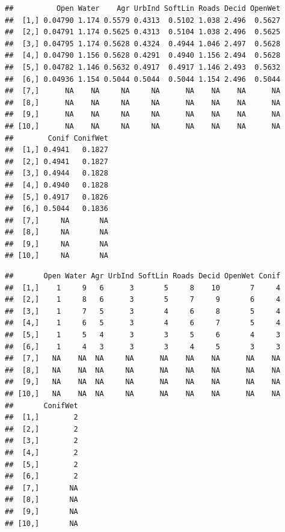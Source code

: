 \documentclass[12pt,]{book}
\newenvironment{Shaded}{\begin{snugshade}}{\end{snugshade}}
\newcommand{\CommentTok}[1]{\textcolor[rgb]{0.56,0.35,0.01}{\textit{#1}}}
\newcommand{\DecValTok}[1]{\textcolor[rgb]{0.00,0.00,0.81}{#1}}
\newcommand{\KeywordTok}[1]{\textcolor[rgb]{0.13,0.29,0.53}{\textbf{#1}}}
\newcommand{\NormalTok}[1]{#1}
\newcommand{\OperatorTok}[1]{\textcolor[rgb]{0.81,0.36,0.00}{\textbf{#1}}}
\begin{document}
\begin{verbatim}
##          Open Water    Agr UrbInd SoftLin Roads Decid OpenWet
##  [1,] 0.04790 1.174 0.5579 0.4313  0.5102 1.038 2.496  0.5627
##  [2,] 0.04791 1.174 0.5625 0.4313  0.5104 1.038 2.496  0.5625
##  [3,] 0.04795 1.174 0.5628 0.4324  0.4944 1.046 2.497  0.5628
##  [4,] 0.04790 1.156 0.5628 0.4291  0.4940 1.156 2.494  0.5628
##  [5,] 0.04782 1.146 0.5632 0.4917  0.4917 1.146 2.493  0.5632
##  [6,] 0.04936 1.154 0.5044 0.5044  0.5044 1.154 2.496  0.5044
##  [7,]      NA    NA     NA     NA      NA    NA    NA      NA
##  [8,]      NA    NA     NA     NA      NA    NA    NA      NA
##  [9,]      NA    NA     NA     NA      NA    NA    NA      NA
## [10,]      NA    NA     NA     NA      NA    NA    NA      NA
##        Conif ConifWet
##  [1,] 0.4941   0.1827
##  [2,] 0.4941   0.1827
##  [3,] 0.4944   0.1828
##  [4,] 0.4940   0.1828
##  [5,] 0.4917   0.1826
##  [6,] 0.5044   0.1836
##  [7,]     NA       NA
##  [8,]     NA       NA
##  [9,]     NA       NA
## [10,]     NA       NA
\end{verbatim}

\begin{Shaded}
\end{Shaded}

\begin{verbatim}
##       Open Water Agr UrbInd SoftLin Roads Decid OpenWet Conif
##  [1,]    1     9   6      3       5     8    10       7     4
##  [2,]    1     8   6      3       5     7     9       6     4
##  [3,]    1     7   5      3       4     6     8       5     4
##  [4,]    1     6   5      3       4     6     7       5     4
##  [5,]    1     5   4      3       3     5     6       4     3
##  [6,]    1     4   3      3       3     4     5       3     3
##  [7,]   NA    NA  NA     NA      NA    NA    NA      NA    NA
##  [8,]   NA    NA  NA     NA      NA    NA    NA      NA    NA
##  [9,]   NA    NA  NA     NA      NA    NA    NA      NA    NA
## [10,]   NA    NA  NA     NA      NA    NA    NA      NA    NA
##       ConifWet
##  [1,]        2
##  [2,]        2
##  [3,]        2
##  [4,]        2
##  [5,]        2
##  [6,]        2
##  [7,]       NA
##  [8,]       NA
##  [9,]       NA
## [10,]       NA
\end{verbatim}

\begin{Shaded}
\end{Shaded}
\end{document}
